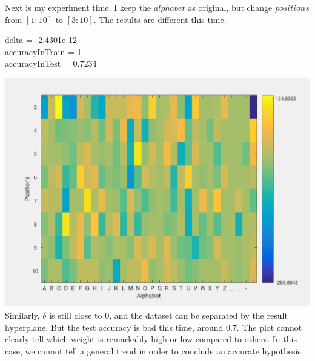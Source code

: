 \begin{enumerate}
\begin{enumerate}
	Next is my experiment time. I keep the $alphabet$ as original, but change $positions$ from $[1:10]$ to $[3:10]$. The results are different this time. \\
	\begin{center}
	delta = -2.4301e-12\\
	accuracyInTrain = 1\\
	accuracyInTest = 0.7234
	\end{center}
	\includegraphics[scale = 0.7]{p3b3_changed}\\
	Similarly, $\delta$ is still close to 0, and the dataset can be separated by the result hyperplane. But the test accuracy is bad this time, around 0.7. The plot cannot clearly tell which weight is remarkably high or low compared to others. In this case, we cannot tell a general trend in order to conclude an accurate hypothesis.
	

\end{enumerate}
\end{enumerate}
